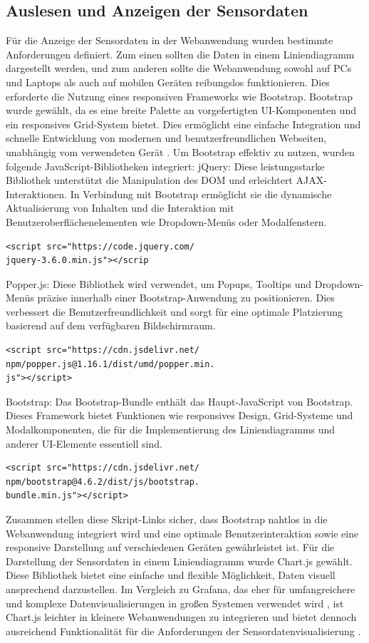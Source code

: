 \documentclass[conference]{IEEEtran}
\begin{document}
\subsection{Auslesen und Anzeigen der Sensordaten}
Für die Anzeige der Sensordaten in der Webanwendung wurden bestimmte Anforderungen definiert. Zum einen sollten die Daten in einem Liniendiagramm dargestellt werden, und zum anderen sollte die Webanwendung sowohl auf PCs und Laptops als auch auf mobilen Geräten reibungslos funktionieren. Dies erforderte die Nutzung eines responsiven Frameworks wie Bootstrap.
Bootstrap wurde gewählt, da es eine breite Palette an vorgefertigten UI-Komponenten und ein responsives Grid-System bietet. Dies ermöglicht eine einfache Integration und schnelle Entwicklung von modernen und benutzerfreundlichen Webseiten, unabhängig vom verwendeten Gerät \cite{bootstrap}.
Um Bootstrap effektiv zu nutzen, wurden folgende JavaScript-Bibliotheken integriert:
jQuery: Diese leistungsstarke Bibliothek unterstützt die Manipulation des DOM und erleichtert AJAX-Interaktionen. In Verbindung mit Bootstrap ermöglicht sie die dynamische Aktualisierung von Inhalten und die Interaktion mit Benutzeroberflächenelementen wie Dropdown-Menüs oder Modalfenstern.
\begin{verbatim}
<script src="https://code.jquery.com/
jquery-3.6.0.min.js"></scrip
\end{verbatim}
Popper.js: Diese Bibliothek wird verwendet, um Popups, Tooltips und Dropdown-Menüs präzise innerhalb einer Bootstrap-Anwendung zu positionieren. Dies verbessert die Benutzerfreundlichkeit und sorgt für eine optimale Platzierung basierend auf dem verfügbaren Bildschirmraum.
\begin{verbatim}
<script src="https://cdn.jsdelivr.net/
npm/popper.js@1.16.1/dist/umd/popper.min.
js"></script>
\end{verbatim}
Bootstrap: Das Bootstrap-Bundle enthält das Haupt-JavaScript von Bootstrap. Dieses Framework bietet Funktionen wie responsives Design, Grid-Systeme und Modalkomponenten, die für die Implementierung des Liniendiagramms und anderer UI-Elemente essentiell sind.
\begin{verbatim}
<script src="https://cdn.jsdelivr.net/
npm/bootstrap@4.6.2/dist/js/bootstrap.
bundle.min.js"></script>
\end{verbatim}
Zusammen stellen diese Skript-Links sicher, dass Bootstrap nahtlos in die Webanwendung integriert wird und eine optimale Benutzerinteraktion sowie eine responsive Darstellung auf verschiedenen Geräten gewährleistet ist.
Für die Darstellung der Sensordaten in einem Liniendiagramm wurde Chart.js gewählt. Diese Bibliothek bietet eine einfache und flexible Möglichkeit, Daten visuell ansprechend darzustellen. Im Vergleich zu Grafana, das eher für umfangreichere und komplexe Datenvisualisierungen in großen Systemen verwendet wird \cite{grafana}, ist Chart.js leichter in kleinere Webanwendungen zu integrieren und bietet dennoch ausreichend Funktionalität für die Anforderungen der Sensordatenvisualisierung \cite{chart.js}.
\end{document}
